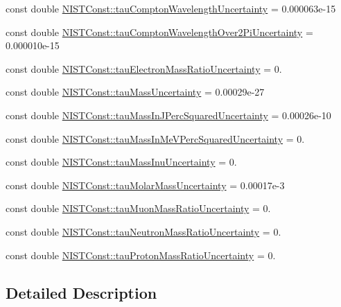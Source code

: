 \begin{DoxyCompactItemize}
\item 
const double \hyperlink{group___n_i_s_t_const-_tau_ga05d2cb36c4bf4734ebedd983535cf27e}{N\+I\+S\+T\+Const\+::tau\+Compton\+Wavelength\+Uncertainty} = 0.\+000063e-\/15
\item 
const double \hyperlink{group___n_i_s_t_const-_tau_gab9853e108c4a32f465e14d286cedde7c}{N\+I\+S\+T\+Const\+::tau\+Compton\+Wavelength\+Over2\+Pi\+Uncertainty} = 0.\+000010e-\/15
\item 
const double \hyperlink{group___n_i_s_t_const-_tau_ga8c2df29fcfd51464a59702fef9b2082a}{N\+I\+S\+T\+Const\+::tau\+Electron\+Mass\+Ratio\+Uncertainty} = 0.
\item 
const double \hyperlink{group___n_i_s_t_const-_tau_gad7d60828078581e6fc33f24fa369b9f2}{N\+I\+S\+T\+Const\+::tau\+Mass\+Uncertainty} = 0.\+00029e-\/27
\item 
const double \hyperlink{group___n_i_s_t_const-_tau_gafe24bdc066842941bc493cfaa799ccf4}{N\+I\+S\+T\+Const\+::tau\+Mass\+In\+J\+Perc\+Squared\+Uncertainty} = 0.\+00026e-\/10
\item 
const double \hyperlink{group___n_i_s_t_const-_tau_ga0778d216f366092aaf0b3a3bbb5a731e}{N\+I\+S\+T\+Const\+::tau\+Mass\+In\+Me\+V\+Perc\+Squared\+Uncertainty} = 0.
\item 
const double \hyperlink{group___n_i_s_t_const-_tau_gad6e1aecdf7331e89b665c40d7d6dad86}{N\+I\+S\+T\+Const\+::tau\+Mass\+Inu\+Uncertainty} = 0.
\item 
const double \hyperlink{group___n_i_s_t_const-_tau_ga8c1b32660badce1280d13a252cae4141}{N\+I\+S\+T\+Const\+::tau\+Molar\+Mass\+Uncertainty} = 0.\+00017e-\/3
\item 
const double \hyperlink{group___n_i_s_t_const-_tau_gab6f6e5f07b2e4e5623fa2edf6b163e53}{N\+I\+S\+T\+Const\+::tau\+Muon\+Mass\+Ratio\+Uncertainty} = 0.
\item 
const double \hyperlink{group___n_i_s_t_const-_tau_ga65d53ed3744dc7b5926ea16b9c62e185}{N\+I\+S\+T\+Const\+::tau\+Neutron\+Mass\+Ratio\+Uncertainty} = 0.
\item 
const double \hyperlink{group___n_i_s_t_const-_tau_ga8c32666623ba327b9d6d8d376fdbad3c}{N\+I\+S\+T\+Const\+::tau\+Proton\+Mass\+Ratio\+Uncertainty} = 0.
\end{DoxyCompactItemize}


\subsection{Detailed Description}


